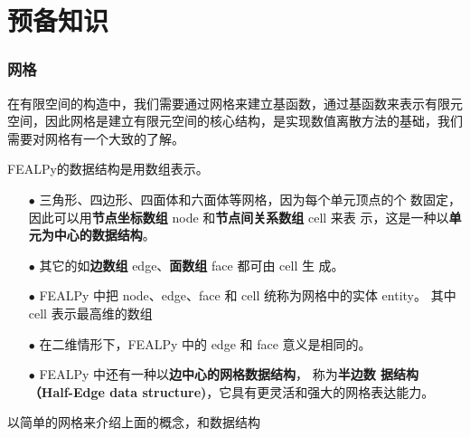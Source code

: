 \newpage
\chapter{预备知识} \label{Chap:SCFT_on_surface}
\subsection{网格}
在有限空间的构造中，我们需要通过网格来建立基函数，通过基函数来表示有限元空间，因此网格是建立有限元空间的核心结构，是实现数值离散方法的基础，我们需要对网格有一个大致的了解。

FEALPy的数据结构是用数组表示。

\begin{itemize}
	\item[$\bullet$] 三角形、四边形、四面体和六面体等网格，因为每个单元顶点的个
	数固定，因此可以用{\bf 节点坐标数组} node 和{\bf 节点间关系数组} cell 来表
	示，这是一种以{\bf 单元为中心的数据结构}。
	\item[$\bullet$] 其它的如{\bf 边数组} edge、{\bf 面数组} face 都可由 cell 生
	成。
	\item[$\bullet$] FEALPy 中把 node、edge、face 和 cell 统称为网格中的实体 entity。
	其中 cell 表示最高维的数组
	\item[$\bullet$] 在二维情形下，FEALPy 中的 edge 和 face 意义是相同的。
	\item[$\bullet$] FEALPy 中还有一种以{\bf 边中心的网格数据结构}， 称为{\bf 半边数
		据结构（Half-Edge data structure)}，它具有更灵活和强大的网格表达能力。
\end{itemize}

以简单的网格来介绍上面的概念，和数据结构


